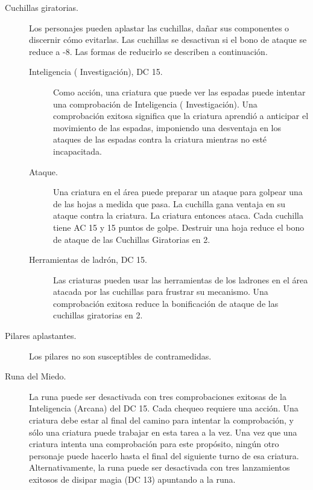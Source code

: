 \documentclass[a4paper,twocolumn,openany,10pt]{dndbook}
\begin{document}
\begin{description}
	\item[Cuchillas giratorias.] Los personajes pueden aplastar las cuchillas, dañar sus componentes o discernir cómo evitarlas.
	Las cuchillas se desactivan si el bono de ataque se reduce a -8. Las formas de reducirlo se describen a continuación.

	\begin{description}
		\item[Inteligencia ( Investigación), DC 15.] Como acción, una criatura que puede ver las espadas puede intentar una
		comprobación de Inteligencia ( Investigación). Una comprobación exitosa significa que la criatura aprendió a anticipar el
		movimiento de las espadas, imponiendo una desventaja en los ataques de las espadas contra la criatura mientras no esté
		incapacitada.

		\item[Ataque.] Una criatura en el área puede preparar un ataque para golpear una de las hojas a medida que pasa. La
		cuchilla gana ventaja en su ataque contra la criatura. La criatura entonces ataca. Cada cuchilla tiene AC 15 y 15 puntos
		de golpe. Destruir una hoja reduce el bono de ataque de las Cuchillas Giratorias en 2.
		
		\item[Herramientas de ladrón, DC 15.] Las criaturas pueden usar las herramientas de los
		ladrones en el área atacada por las cuchillas para frustrar su mecanismo. Una comprobación exitosa reduce la bonificación
		de ataque de las cuchillas giratorias en 2.
	\end{description}

	\item[Pilares aplastantes.] Los pilares no son susceptibles de contramedidas.

	\item[Runa del Miedo.] La runa puede ser desactivada con tres comprobaciones exitosas de la Inteligencia (Arcana) del DC
	15. Cada chequeo requiere una acción. Una criatura debe estar al final del camino para intentar la comprobación, y sólo una
	criatura puede trabajar en esta tarea a la vez. Una vez que una criatura intenta una comprobación para este propósito, ningún
	otro personaje puede hacerlo hasta el final del siguiente turno de esa criatura. Alternativamente, la runa puede ser
	desactivada con tres lanzamientos exitosos de disipar magia (DC 13) apuntando a la runa.
\end{description}
\end{document}
